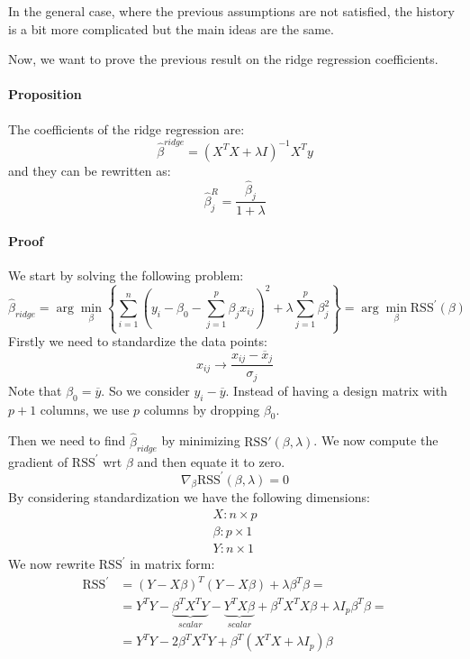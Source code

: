 In the general case, where the previous assumptions are not satisfied, the history is a bit more complicated but the main ideas are the same.

Now, we want to prove the previous result on the ridge regression coefficients.
\paragraph*{Proposition}
The coefficients of the ridge regression are:
\[
    \hat{\beta}^{ridge} = \left(X^T X + \lambda I\right)^{-1} X^T y
\]
and they can be rewritten as:
\[
    \hat{\beta}_j^R = \frac{\hat{\beta}_j}{1 + \lambda}
\]


\paragraph*{Proof}
We start by solving the following problem:
\[
    \hat{\beta}_{ridge} = \arg\min_\beta  \left\{ \sum_{i=1}^n (y_i - \beta_0 - \sum_{j = 1}^p \beta_j x_{ij})^2  + \lambda\sum_{j = 1}^p \beta_j^2 \right\} = \arg\min_\beta \text{RSS}^{\prime} (\beta)
\]
Firstly we need to standardize the data points:
\[
    x_{ij} \to \frac{x_{ij} - \overline{x}_j}{\sigma_j}
\]
Note that $\beta_0 = \overline{y}$. So we consider $y_i - \overline{y}$. Instead of having a design matrix with $p+1$ columns, we use $p$ columns by dropping $\beta_0$.

Then we need to find $\hat{\beta}_{ridge}$ by minimizing $\text{RSS}'(\beta, \lambda)$. We now compute the gradient of $\text{RSS}^{\prime}$ wrt $\beta$ and then equate it to zero.
\[
    \nabla_\beta \text{RSS}^{\prime} (\beta, \lambda) = 0
\]
By considering standardization we have the following dimensions:
\begin{align*}
    X: n\times p     \\
    \beta: p\times 1 \\
    Y: n \times 1
\end{align*}
We now rewrite $\text{RSS}^{\prime}$ in matrix form:
\begin{align*}
    \text{RSS}^{\prime} & = (Y - X \beta)^T (Y - X \beta) + \lambda \beta^T \beta =                                                                                              \\
                        & = Y^T Y - \underbrace{\beta^T X^T Y}_{scalar} - \underbrace{Y^T X \beta}_{scalar}+                 \beta^T X^T X \beta + \lambda I_{p} \beta^T \beta = \\
                        & = Y^T Y - 2 \beta^T X^T Y + \beta^T (X^T X + \lambda I_p) \beta
\end{align*}

